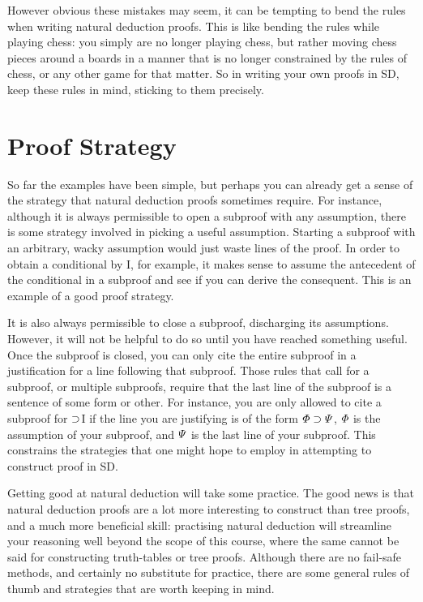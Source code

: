 However obvious these mistakes may seem, it can be tempting to bend the rules when writing natural deduction proofs.
This is like bending the rules while playing chess: you simply are no longer playing chess, but rather moving chess pieces around a boards in a manner that is no longer constrained by the rules of chess, or any other game for that matter.
So in writing your own proofs in SD, keep these rules in mind, sticking to them precisely.




\section{Proof Strategy}
\label{sec.SL.ND.strategy}

So far the examples have been simple, but perhaps you can already get a sense of the strategy that natural deduction proofs sometimes require.
For instance, although it is always permissible to open a subproof with any assumption, there is some strategy involved in picking a useful assumption.
Starting a subproof with an arbitrary, wacky assumption would just waste lines of the proof.
In order to obtain a conditional by {\eif}I, for example, it makes sense to assume the antecedent of the conditional in a subproof and see if you can derive the consequent.
This is an example of a good proof strategy.

It is also always permissible to close a subproof, discharging its assumptions.
However, it will not be helpful to do so until you have reached something useful.
Once the subproof is closed, you can only cite the entire subproof in a justification for a line following that subproof.
Those rules that call for a subproof, or multiple subproofs, require that the last line of the subproof is a sentence of some form or other.
For instance, you are only allowed to cite a subproof for $\supset$I if the line you are justifying is of the form $\varPhi \supset \varPsi$, $\varPhi$ is the assumption of your subproof, and $\varPsi$ is the last line of your subproof.
This constrains the strategies that one might hope to employ in attempting to construct proof in SD.

Getting good at natural deduction will take some practice.
The good news is that natural deduction proofs are a lot more interesting to construct than tree proofs, and a much more beneficial skill: practising natural deduction will streamline your reasoning well beyond the scope of this course, where the same cannot be said for constructing truth-tables or tree proofs.
Although there are no fail-safe methods, and certainly no substitute for practice, there are some general rules of thumb and strategies that are worth keeping in mind.


